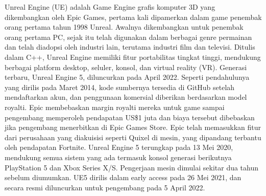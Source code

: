 Unreal Engine (UE) adalah Game Engine grafis komputer 3D yang dikembangkan oleh Epic Games, pertama kali dipamerkan dalam game penembak orang pertama tahun 1998 Unreal. 
Awalnya dikembangkan untuk penembak orang pertama PC, sejak itu telah digunakan dalam berbagai genre permainan dan telah diadopsi oleh industri lain, terutama industri film dan televisi. Ditulis dalam C++, 
Unreal Engine memiliki fitur portabilitas tingkat tinggi, mendukung berbagai platform desktop, seluler, konsol, dan virtual reality (VR).
Generasi terbaru, Unreal Engine 5, diluncurkan pada April 2022. Seperti pendahulunya yang dirilis pada Maret 2014, kode sumbernya tersedia di GitHub setelah mendaftarkan akun, dan penggunaan komersial diberikan 
berdasarkan model royalti. Epic membebaskan margin royalti mereka untuk game sampai pengembang memperoleh pendapatan US\$1 juta dan biaya tersebut dibebaskan jika pengembang menerbitkan di Epic Games Store. Epic telah memasukkan fitur dari perusahaan yang diakuisisi seperti Quixel di mesin, yang dipandang terbantu oleh pendapatan Fortnite.
Unreal Engine 5 terungkap pada 13 Mei 2020, mendukung semua sistem yang ada termasuk konsol generasi berikutnya PlayStation 5 dan Xbox Series X/S.\citep{StattEpicAnnounce} Pengerjaan mesin dimulai sekitar dua 
tahun sebelum diumumkan.\citep{DeanTakahashi} UE5 dirilis dalam early access pada 26 Mei 2021,\citep{EddieMakuch} dan secara resmi diluncurkan untuk pengembang pada 5 April 2022.\citep{UE5Launch}

